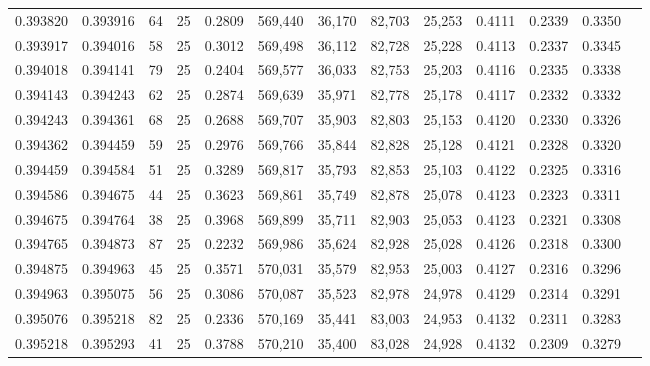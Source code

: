 \begin{tabular}{rrrrrrrrrrrrr}
0.393820 & 0.393916 &    64 &  25 &                                     0.2809 & 569,440 &  36,170 &  82,703 &  25,253 & 0.4111 & 0.2339 & 0.3350 \\
0.393917 & 0.394016 &    58 &  25 &                                     0.3012 & 569,498 &  36,112 &  82,728 &  25,228 & 0.4113 & 0.2337 & 0.3345 \\
0.394018 & 0.394141 &    79 &  25 &                                     0.2404 & 569,577 &  36,033 &  82,753 &  25,203 & 0.4116 & 0.2335 & 0.3338 \\
0.394143 & 0.394243 &    62 &  25 &                                     0.2874 & 569,639 &  35,971 &  82,778 &  25,178 & 0.4117 & 0.2332 & 0.3332 \\
0.394243 & 0.394361 &    68 &  25 &                                     0.2688 & 569,707 &  35,903 &  82,803 &  25,153 & 0.4120 & 0.2330 & 0.3326 \\
0.394362 & 0.394459 &    59 &  25 &                                     0.2976 & 569,766 &  35,844 &  82,828 &  25,128 & 0.4121 & 0.2328 & 0.3320 \\
0.394459 & 0.394584 &    51 &  25 &                                     0.3289 & 569,817 &  35,793 &  82,853 &  25,103 & 0.4122 & 0.2325 & 0.3316 \\
0.394586 & 0.394675 &    44 &  25 &                                     0.3623 & 569,861 &  35,749 &  82,878 &  25,078 & 0.4123 & 0.2323 & 0.3311 \\
0.394675 & 0.394764 &    38 &  25 &                                     0.3968 & 569,899 &  35,711 &  82,903 &  25,053 & 0.4123 & 0.2321 & 0.3308 \\
0.394765 & 0.394873 &    87 &  25 &                                     0.2232 & 569,986 &  35,624 &  82,928 &  25,028 & 0.4126 & 0.2318 & 0.3300 \\
0.394875 & 0.394963 &    45 &  25 &                                     0.3571 & 570,031 &  35,579 &  82,953 &  25,003 & 0.4127 & 0.2316 & 0.3296 \\
0.394963 & 0.395075 &    56 &  25 &                                     0.3086 & 570,087 &  35,523 &  82,978 &  24,978 & 0.4129 & 0.2314 & 0.3291 \\
0.395076 & 0.395218 &    82 &  25 &                                     0.2336 & 570,169 &  35,441 &  83,003 &  24,953 & 0.4132 & 0.2311 & 0.3283 \\
0.395218 & 0.395293 &    41 &  25 &                                     0.3788 & 570,210 &  35,400 &  83,028 &  24,928 & 0.4132 & 0.2309 & 0.3279 \\

\end{tabular}
